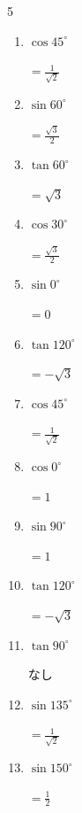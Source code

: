 \begin{multicols}{5}
\begin{enumerate}
        $\displaystyle =\frac{1}{\sqrt{2}}$

  \item $\displaystyle \cos{45^\circ}$

        $\displaystyle =\frac{1}{\sqrt{2}}$

  \item $\displaystyle \sin{60^\circ}$

        $\displaystyle =\frac{\sqrt{3}}{2}$

  \item $\displaystyle \tan{60^\circ}$

        $\displaystyle =\sqrt{3}$

  \item $\displaystyle \cos{30^\circ}$

        $\displaystyle =\frac{\sqrt{3}}{2}$

  \item $\displaystyle \sin{0^\circ}$

        $\displaystyle =0$

  \item $\displaystyle \tan{120^\circ}$

        $\displaystyle =-\sqrt{3}$

  \item $\displaystyle \cos{45^\circ}$

        $\displaystyle =\frac{1}{\sqrt{2}}$

  \item $\displaystyle \cos{0^\circ}$

        $\displaystyle =1$

  \item $\displaystyle \sin{90^\circ}$

        $\displaystyle =1$

  \item $\displaystyle \tan{120^\circ}$

        $\displaystyle =-\sqrt{3}$

  \item $\displaystyle \tan{90^\circ}$

        $\displaystyle なし$

  \item $\displaystyle \sin{135^\circ}$

        $\displaystyle =\frac{1}{\sqrt{2}}$

  \item $\displaystyle \sin{150^\circ}$

        $\displaystyle =\frac{1}{2}$


\end{enumerate}
\end{multicols}
